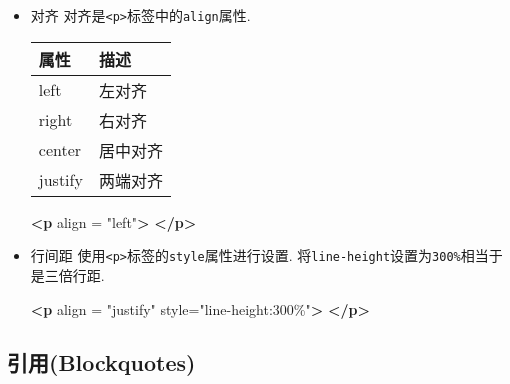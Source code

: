 \documentclass[]{ctexbook}
\newenvironment{Shaded}{\begin{snugshade}}{\end{snugshade}}
\newcommand{\KeywordTok}[1]{\textcolor[rgb]{0.13,0.29,0.53}{\textbf{#1}}}
\newcommand{\OtherTok}[1]{\textcolor[rgb]{0.56,0.35,0.01}{#1}}
\newcommand{\StringTok}[1]{\textcolor[rgb]{0.31,0.60,0.02}{#1}}
\begin{document}
\begin{itemize}
\item
  对齐
  对齐是\texttt{\textless{}p\textgreater{}}标签中的\texttt{align}属性.

  \begin{longtable}[]{@{}ll@{}}
  \toprule
  属性 & 描述\tabularnewline
  \midrule
  \endhead
  left & 左对齐\tabularnewline
  right & 右对齐\tabularnewline
  center & 居中对齐\tabularnewline
  justify & 两端对齐\tabularnewline
  \bottomrule
  \end{longtable}

\begin{Shaded}
\begin{Highlighting}[]
\KeywordTok{\textless{}p}\OtherTok{ align} \OtherTok{=} \StringTok{"left"}\KeywordTok{\textgreater{}} 
\KeywordTok{\textless{}/p\textgreater{}}
\end{Highlighting}
\end{Shaded}
\item
  行间距
  使用\texttt{\textless{}p\textgreater{}}标签的\texttt{style}属性进行设置.
  将\texttt{line-height}设置为\texttt{300\%}相当于是三倍行距.

\begin{Shaded}
\begin{Highlighting}[]
\KeywordTok{\textless{}p}\OtherTok{ align} \OtherTok{=} \StringTok{"justify"}\OtherTok{ style=}\StringTok{"line{-}height:300\%"}\KeywordTok{\textgreater{}} 
\KeywordTok{\textless{}/p\textgreater{}}
\end{Highlighting}
\end{Shaded}
\end{itemize}

\hypertarget{ux5f15ux7528blockquotes}{%
\subsection{引用(Blockquotes)}\label{ux5f15ux7528blockquotes}}
\end{document}

